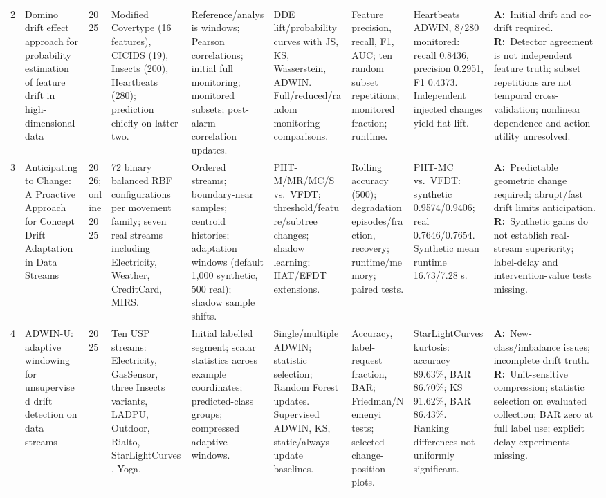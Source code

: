 \documentclass[10pt,a4paper]{article}
\newcommand{\A}{\textbf{A:}\ }
\newcommand{\R}{\textbf{R:}\ }
\begin{document}
\begin{landscape}
\begin{longtable}{L{0.4cm}L{3.55cm}L{0.95cm}L{2.6cm}L{2.7cm}L{2.65cm}L{2.2cm}L{2.4cm}L{4.1cm}}
2 & Domino drift effect approach for probability estimation of feature drift in high-dimensional data \cite{szucs} &
2025 & Modified Covertype (16 features), CICIDS (19), Insects (200), Heartbeats (280); prediction chiefly on latter two. &
Reference/analysis windows; Pearson correlations; initial full monitoring; monitored subsets; post-alarm correlation updates. &
DDE lift/probability curves with JS, KS, Wasserstein, ADWIN. Full/reduced/random monitoring comparisons. &
Feature precision, recall, F1, AUC; ten random subset repetitions; monitored fraction; runtime. &
Heartbeats ADWIN, 8/280 monitored: recall 0.8436, precision 0.2951, F1 0.4373. Independent injected changes yield flat lift. &
\A Initial drift and co-drift required.
\R Detector agreement is not independent feature truth; subset repetitions are not temporal cross-validation; nonlinear dependence and action utility unresolved.\\[4pt]

3 & Anticipating to Change: A Proactive Approach for Concept Drift Adaptation in Data Streams \cite{guerrero} &
2026; online 2025 & 72 binary balanced RBF configurations per movement family; seven real streams including Electricity, Weather, CreditCard, MIRS. &
Ordered streams; boundary-near samples; centroid histories; adaptation windows (default 1,000 synthetic, 500 real); shadow sample shifts. &
PHT-M/MR/MC/S vs.\ VFDT; threshold/feature/subtree changes; shadow learning; HAT/EFDT extensions. &
Rolling accuracy (500); degradation episodes/fraction, recovery; runtime/memory; paired tests. &
PHT-MC vs.\ VFDT: synthetic 0.9574/0.9406; real 0.7646/0.7654. Synthetic mean runtime 16.73/7.28 s. &
\A Predictable geometric change required; abrupt/fast drift limits anticipation.
\R Synthetic gains do not establish real-stream superiority; label-delay and intervention-value tests missing.\\[4pt]

4 & ADWIN-U: adaptive windowing for unsupervised drift detection on data streams \cite{assis} &
2025 & Ten USP streams: Electricity, GasSensor, three Insects variants, LADPU, Outdoor, Rialto, StarLightCurves, Yoga. &
Initial labelled segment; scalar statistics across example coordinates; predicted-class groups; compressed adaptive windows. &
Single/multiple ADWIN; statistic selection; Random Forest updates. Supervised ADWIN, KS, static/always-update baselines. &
Accuracy, label-request fraction, BAR; Friedman/Nemenyi tests; selected change-position plots. &
StarLightCurves kurtosis: accuracy 89.63\%, BAR 86.70\%; KS 91.62\%, BAR 86.43\%. Ranking differences not uniformly significant. &
\A New-class/imbalance issues; incomplete drift truth.
\R Unit-sensitive compression; statistic selection on evaluated collection; BAR zero at full label use; explicit delay experiments missing.\\[4pt]


\end{longtable}
\end{landscape}
\end{document}
